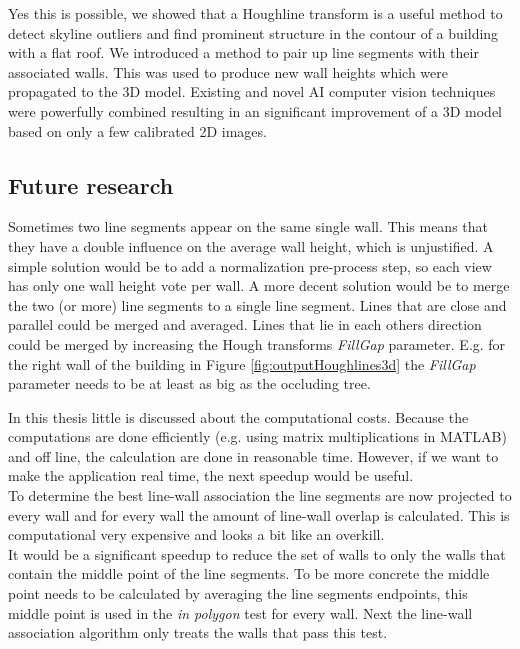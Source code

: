 Yes this is possible, we showed that a Houghline transform is a useful method to detect
skyline outliers and find prominent structure in the contour of a building with a flat
roof. We introduced a method to pair up line segments with their associated
walls. This was used to produce new wall heights which were propagated to the 3D
model.  Existing and novel AI computer vision techniques were powerfully
combined resulting in an significant improvement of a 3D model based on only a
few calibrated 2D images. 

\subsection{Future research}
Sometimes two line segments appear on the same single wall. This means that they have a double
influence on the average wall height, which is unjustified. 
A simple solution would be to add a normalization pre-process step, so each view
has only one wall height vote per wall. A more decent solution would be to
merge the two (or more) line segments to a single line segment. 
Lines that are close and parallel could be merged and averaged.
Lines that lie in each others direction could be merged by increasing the 
Hough transforms \emph{FillGap} parameter.  E.g. for the right wall of the building in 
Figure \ref{fig:outputHoughlines3d} the \emph{FillGap} parameter needs to be at
least as big as the occluding tree.


In this thesis little is discussed about the computational costs. Because the 
computations are done efficiently (e.g. using matrix multiplications
in MATLAB) and off line, the calculation are done in reasonable time.
However, if we want to make the application real time, the next speedup would be useful.\\
To determine the best line-wall association the line segments are now projected to
every wall and for every wall the amount of line-wall overlap is calculated. This
is computational very expensive and looks a bit like an overkill.\\

It would be a significant speedup to reduce the set of walls to only the walls
that contain the middle point of the line segments. To be more concrete the
middle point needs to be calculated by averaging the line segments endpoints,
this middle point is used in the \emph{in polygon} test for every wall.  Next the
line-wall association algorithm only treats the walls that pass this test.

